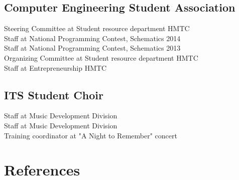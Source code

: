 \documentclass[letterpaper]{deedy-resume} %
\begin{document}
\begin{minipage}[t]{0.39\textwidth}
\subsection{Computer Engineering Student Association}
  Steering Committee at Student resource department HMTC \\
  Staff at National Programming Contest, Schematics 2014 \\
  Staff at National Programming Contest, Schematics 2013 \\
  Organizing Committee at Student resource department HMTC \\
  Staff at Entrepreneurship HMTC \\
\sectionspace

\subsection{ITS Student Choir}
  Staff at Music Development Division \\
  Staff at Music Development Division \\
  Training coordinator at "A Night to Remember" concert \\
\sectionspace

\end{minipage} %
\begin{minipage}[t]{0.59\textwidth} %

\section{References}

\end{minipage} %

\end{document}
